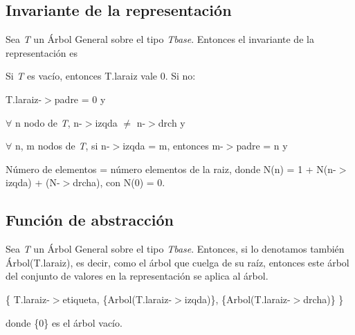 \hypertarget{repConjunto_invConjunto}{}\subsection{Invariante de la representación}\label{repConjunto_invConjunto}
Sea {\itshape T} un Árbol General sobre el tipo {\itshape Tbase}. Entonces el invariante de la representación es

Si {\itshape T} es vacío, entonces T.\-laraiz vale 0. Si no\-:
\begin{DoxyItemize}
\item T.\-laraiz-\/$>$padre = 0 y
\item $ \forall $ n nodo de {\itshape T}, n-\/$>$izqda $ \neq $ n-\/$>$drch y
\item $ \forall $ n, m nodos de {\itshape T}, si n-\/$>$izqda = m, entonces m-\/$>$padre = n y
\item Número de elementos = número elementos de la raiz, donde N(n) = 1 + N(n-\/$>$izqda) + (N-\/$>$drcha), con N(0) = 0.
\end{DoxyItemize}\hypertarget{repConjunto_faConjunto}{}\subsection{Función de abstracción}\label{repConjunto_faConjunto}
Sea {\itshape T} un Árbol General sobre el tipo {\itshape Tbase}. Entonces, si lo denotamos también Árbol(T.\-laraiz), es decir, como el árbol que cuelga de su raíz, entonces este árbol del conjunto de valores en la representación se aplica al árbol.

\{ T.\-laraiz-\/$>$etiqueta, \{Arbol(T.\-laraiz-\/$>$izqda)\}, \{Arbol(T.\-laraiz-\/$>$drcha)\} \}

donde \{0\} es el árbol vacío. 